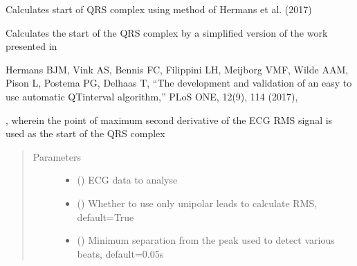 \documentclass[letterpaper,10pt,english]{sphinxmanual}
\begin{document}
\begin{fulllineitems}

\begin{fulllineitems}
\label{\detokenize{_autosummary/signalanalysis.ecg.Ecg:id1}}
\sphinxAtStartPar
Calculates start of QRS complex using method of Hermans et al. (2017)

\sphinxAtStartPar
Calculates the start of the QRS complex by a simplified version of the work presented in \sphinxstepexplicit %
\begin{footnote}[1]\label{\thesphinxscope.1}%
\sphinxAtStartFootnote
Hermans BJM, Vink AS, Bennis FC, Filippini LH, Meijborg VMF, Wilde AAM, Pison L, Postema PG, Delhaas T,
“The development and validation of an easy to use automatic QT\sphinxhyphen{}interval algorithm,”
PLoS ONE, 12(9), 1\textendash{}14 (2017), 
%
\end{footnote}, wherein the
point of maximum second derivative of the ECG RMS signal is used as the start of the QRS complex
\begin{quote}\begin{description}
\item[{Parameters}] \leavevmode\begin{itemize}
\item {} 
\sphinxAtStartPar
{} ({\hyperref[\detokenize{_autosummary/signalanalysis.ecg.Ecg:signalanalysis.ecg.Ecg}]{}}) \textendash{} ECG data to analyse

\item {} 
\sphinxAtStartPar
{} (\sphinxstyleliteralemphasis{\sphinxupquote{, }}) \textendash{} Whether to use only unipolar leads to calculate RMS, default=True

\item {} 
\sphinxAtStartPar
{} (\sphinxstyleliteralemphasis{\sphinxupquote{, }}) \textendash{} Minimum separation from the peak used to detect various beats, default=0.05s


\end{itemize}
\end{description}
\end{quote}
\end{fulllineitems}
\end{fulllineitems}
\end{document}
